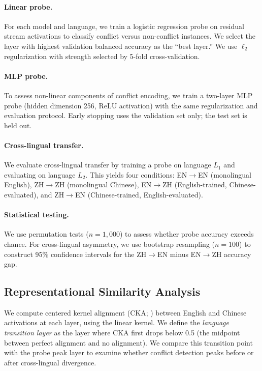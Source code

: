 \documentclass[11pt]{article}
\begin{document}
\paragraph{Linear probe.}
For each model and language, we train a logistic regression probe on residual stream activations to classify conflict versus non-conflict instances.
We select the layer with highest validation balanced accuracy as the ``best layer.''
We use $\ell_2$ regularization with strength selected by 5-fold cross-validation.

\paragraph{MLP probe.}
To assess non-linear components of conflict encoding, we train a two-layer MLP probe (hidden dimension 256, ReLU activation) with the same regularization and evaluation protocol.
Early stopping uses the validation set only; the test set is held out.

\paragraph{Cross-lingual transfer.}
We evaluate cross-lingual transfer by training a probe on language $L_1$ and evaluating on language $L_2$.
This yields four conditions: EN$\to$EN (monolingual English), ZH$\to$ZH (monolingual Chinese), EN$\to$ZH (English-trained, Chinese-evaluated), and ZH$\to$EN (Chinese-trained, English-evaluated).

\paragraph{Statistical testing.}
We use permutation tests ($n = 1{,}000$) to assess whether probe accuracy exceeds chance.
For cross-lingual asymmetry, we use bootstrap resampling ($n = 100$) to construct 95\% confidence intervals for the ZH$\to$EN minus EN$\to$ZH accuracy gap.

\subsection{Representational Similarity Analysis}

We compute centered kernel alignment (CKA; \citealp{kornblith2019similarity}) between English and Chinese activations at each layer, using the linear kernel.
We define the \emph{language transition layer} as the layer where CKA first drops below 0.5 (the midpoint between perfect alignment and no alignment).
We compare this transition point with the probe peak layer to examine whether conflict detection peaks before or after cross-lingual divergence.
\end{document}
